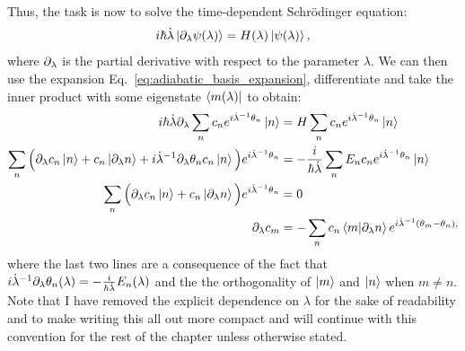     Thus, the task is now to solve the time-dependent Schr\"{o}dinger equation:
    \begin{equation}\label{eq:td-schroedinger}
        i\hbar \dot{\lambda} \ket{\partial_{\lambda} \psi(\lambda)} = H(\lambda) \ket{\psi(\lambda)},
    \end{equation}
    where $\partial_{\lambda}$ is the partial derivative with respect to the parameter $\lambda$. We can then use the expansion Eq.~\eqref{eq:adiabatic_basis_expansion}, differentiate and take the inner product with some eigenstate $\bra{m(\lambda)}$ to obtain:
    \begin{equation}\label{eq:adiabatic_derivation}
        \begin{aligned}
         i\hbar \dot{\lambda} \partial_{\lambda} \sum_n c_n e^{i \dot{\lambda}^{-1} \theta_n} \ket{n} &= H \sum_n c_n e^{i \dot{\lambda}^{-1} \theta_n} \ket{n} \\
        \sum_n \Big( \partial_{\lambda} c_n \ket{n} + c_n \ket{\partial_{\lambda} n} + i \dot{\lambda}^{-1} \partial_{\lambda}\theta_n c_n \ket{n} \Big)e^{i \dot{\lambda}^{-1} \theta_n} &= -\frac{i}{\hbar \dot{\lambda}} \sum_n E_n c_n e^{i \dot{\lambda}^{-1} \theta_n} \ket{n} \\
        \sum_n \Big( \partial_{\lambda} c_n \ket{n} + c_n \ket{\partial_{\lambda} n} \Big)e^{i \dot{\lambda}^{-1} \theta_n} &= 0 \\
        \partial_{\lambda} c_m  &= - \sum_n c_n \braket{m}{\partial_{\lambda} n}e^{i\dot{\lambda}^{-1}(\theta_m-\theta_n),}
        \end{aligned}
    \end{equation}
    where the last two lines are a consequence of the fact that $i \dot{\lambda}^{-1} \partial_{\lambda} \theta_n(\lambda) = -\frac{i}{\hbar \dot{\lambda}} E_n(\lambda)$ and the the orthogonality of $\ket{m}$ and $\ket{n}$ when $m \neq n$. Note that I have removed the explicit dependence on $\lambda$ for the sake of readability and to make writing this all out more compact and will continue with this convention for the rest of the chapter unless otherwise stated. 
    
